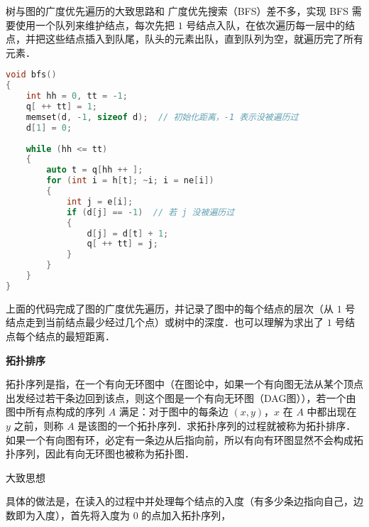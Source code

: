 
树与图的广度优先遍历的大致思路和 广度优先搜索（BFS）差不多，实现 BFS 需要使用一个队列来维护结点，每次先把 $1$ 号结点入队，在依次遍历每一层中的结点，并把这些结点插入到队尾，队头的元素出队，直到队列为空，就遍历完了所有元素．

\begin{lstlisting}[language=cpp]
void bfs()
{
    int hh = 0, tt = -1;
    q[ ++ tt] = 1;
    memset(d, -1, sizeof d);  // 初始化距离，-1 表示没被遍历过
    d[1] = 0;
    
    while (hh <= tt)
    {
        auto t = q[hh ++ ];
        for (int i = h[t]; ~i; i = ne[i])
        {
            int j = e[i];
            if (d[j] == -1)  // 若 j 没被遍历过
            {
                d[j] = d[t] + 1;
                q[ ++ tt] = j;
            }
        }
    }
}
\end{lstlisting}

上面的代码完成了图的广度优先遍历，并记录了图中的每个结点的层次（从 $1$ 号结点走到当前结点最少经过几个点）或树中的深度．也可以理解为求出了 $1$ 号结点每个结点的最短距离．

\textbf{拓扑排序}

拓扑序列是指，在一个有向无环图中（在图论中，如果一个有向图无法从某个顶点出发经过若干条边回到该点，则这个图是一个有向无环图（DAG图）），若一个由图中所有点构成的序列 $A$ 满足：对于图中的每条边 $(x, y)$，$x$ 在 $A$ 中都出现在 $y$ 之前，则称 $A$ 是该图的一个拓扑序列．求拓扑序列的过程就被称为拓扑排序．如果一个有向图有环，必定有一条边从后指向前，所以有向有环图显然不会构成拓扑序列，因此有向无环图也被称为拓扑图．

大致思想

具体的做法是，在读入的过程中并处理每个结点的入度（有多少条边指向自己，边数即为入度），首先将入度为 $0$ 的点加入拓扑序列，